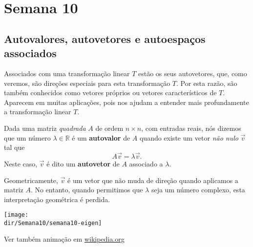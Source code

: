 \documentclass[../livro.tex]{subfiles}  %
\providecommand{\dir}{..}
\begin{document}
\chapter{Semana 10}


\section{Autovalores, autovetores e autoespaços associados}

Associados com uma transformação linear $T$ estão os seus autovetores, que, como veremos, são direções especiais para esta transformação $T$. Por esta razão, são também conhecidos como vetores próprios ou vetores característicos de $T$. Aparecem em muitas aplicações, pois nos ajudam a entender mais profundamente a transformação linear $T$.

Dada uma matriz \textit{quadrada} $A$ de ordem $n \times n$, com entradas reais, nós dizemos que um número $\lambda \in \mathbb{R}$ é um \textbf{autovalor} de $A$ quando existe um vetor \textit{não nulo} $\vec{v}$ tal que
\begin{equation}
A \vec{v} = \lambda \vec{v}.
\end{equation} Neste caso, $\vec{v}$ é dito um \textbf{autovetor} de $A$ associado a $\lambda$.

Geometricamente, $\vec{v}$ é um vetor que não muda de direção quando aplicamos a matriz $A$. No entanto, quando permitimos que $\lambda$ seja um número complexo, esta interpretação geométrica é perdida.

		\texttt{[image: \\dir/Semana10/semana10-eigen]}

\noindent Ver também animação em \href{https://en.wikipedia.org/wiki/Eigenvalues_and_eigenvectors#Matrix_examples}{wikipedia.org}
\end{document}
